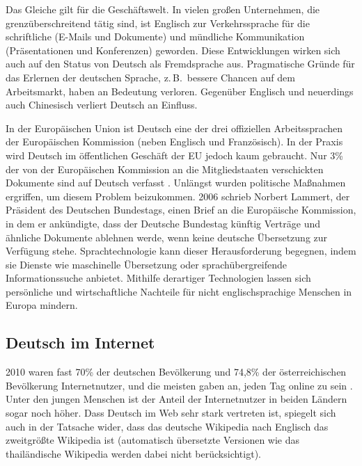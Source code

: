 \documentclass[]{../../metanetpaper}
\begin{document}
\begin{multicols}{2}
Das Gleiche gilt für die Geschäftswelt. In vielen großen Unternehmen, die grenzüberschreitend tätig sind, ist Englisch zur Verkehrssprache für die schriftliche (E-Mails und Dokumente) und mündliche Kommunikation (Präsentationen und Konferenzen) geworden. Diese Entwicklungen wirken sich auch auf den Status von Deutsch als Fremdsprache aus. Pragmatische Gründe für das Erlernen der deutschen Sprache, z.\,B.~bessere Chancen auf dem Arbeitsmarkt, haben an Bedeutung verloren. Gegenüber Englisch und neuerdings auch Chinesisch verliert Deutsch an Einfluss. 

In der Europäischen Union ist Deutsch eine der drei offiziellen Arbeitssprachen der Europäischen Kommission (neben Englisch und Französisch). In der Praxis wird Deutsch im öffentlichen Geschäft der EU jedoch kaum gebraucht. Nur 3\% der von der Europäischen Kommission an die Mitgliedstaaten verschickten Dokumente sind auf Deutsch verfasst \cite{joy1}. Unlängst wurden politische Maßnahmen ergriffen, um diesem Problem beizukommen. 2006 schrieb Norbert Lammert, der Präsident des Deutschen Bundestags, einen Brief an die Europäische Kommission, in dem er ankündigte, dass der Deutsche Bundestag künftig Verträge und ähnliche Dokumente ablehnen werde, wenn keine deutsche Übersetzung zur Verfügung stehe. Sprachtechnologie kann dieser Herausforderung begegnen, indem sie Dienste wie maschinelle Übersetzung oder sprachübergreifende Informationssuche anbietet. Mithilfe derartiger Technologien lassen sich persönliche und wirtschaftliche Nachteile für nicht englischsprachige Menschen in Europa mindern.


\subsection{Deutsch im Internet}

2010 waren fast 70\% der deutschen Bevölkerung und 74,8\% der österreichischen Bevölkerung Internetnutzer, und die meisten gaben an, jeden Tag online zu sein \cite{ard1,ict1}. Unter den jungen Menschen ist der Anteil der Internetnutzer in beiden Ländern sogar noch höher. Dass Deutsch im Web sehr stark vertreten ist, spiegelt sich auch in der Tatsache wider, dass das deutsche Wikipedia nach Englisch das zweitgrößte Wikipedia ist (automatisch übersetzte Versionen wie das thailändische Wikipedia werden dabei nicht berücksichtigt).


\end{multicols}
\end{document}
